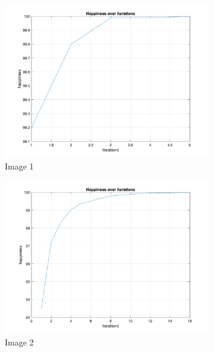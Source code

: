 \documentclass[unicode,11pt,a4paper,oneside,numbers=endperiod,openany]{scrartcl}
\begin{document}
\begin{figure}[H]
    
    \begin{subfigure}[b]{0.4\textwidth}
        
      \includegraphics[width=\textwidth]{Convergence/ConvergenceH1Random_1.png}
      \caption{Image 1}
      \label{fig:image1}
    \end{subfigure}
    \begin{subfigure}[b]{0.4\textwidth}
        \includegraphics[width=\textwidth]{Convergence/ConvergenceH2Random_1.png}
        \caption{Image 2}
        \label{fig:image2}
      \end{subfigure}
      \begin{subfigure}[b]{0.4\textwidth}
        

\end{subfigure}
\end{figure}
\end{document}
